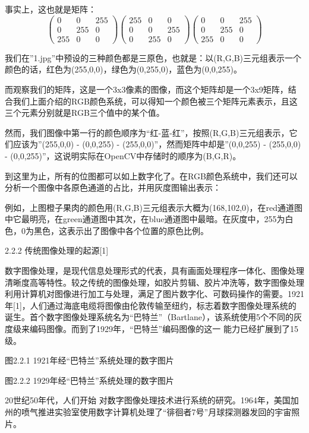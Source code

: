 	事实上，这也就是矩阵：
$$\begin{pmatrix}0&0&255\\0&255&0\\255&0&0\end{pmatrix}\begin{pmatrix}255&0&0\\0&0&255\\0&255&0\end{pmatrix}\begin{pmatrix}0&0&255\\0&255&0\\255&0&0\end{pmatrix}$$

	我们在”1.jpg”中预设的三种颜色都是三原色，也就是：以(R,G,B)三元组表示一个颜色的话，红色为(255,0,0)，绿色为(0,255,0)，蓝色为(0,0,255)。

	而观察我们的矩阵，这是一个3x3像素的图像，而这个矩阵却是一个3x9矩阵，结合我们上面介绍的RGB颜色系统，可以得知一个颜色被三个矩阵元素表示，且这三个元素分别就是RGB三个值中的某个值。

	然而，我们图像中第一行的颜色顺序为“红-蓝-红”，按照(R,G,B)三元组表示，它们应该为”(255,0,0) - (0,0,255) - (255,0,0)”，然而矩阵中却是”(0,0,255) - (255,0,0) - (0,0,255)”，这说明实际在OpenCV中存储时的顺序为(B,G,R)。

	到这里为止，所有的位图都可以如上数字化了。在RGB颜色系统中，我们还可以分析一个图像中各原色通道的占比，并用灰度图输出表示：

	例如，上图橙子果肉的颜色用(R,G,B)三元组表示大概为(168,102,0)，在red通道图中它最明亮，在green通道图中其次，在blue通道图中最暗。在灰度中，255为白色，0为黑色，这表示出了图像中各个位置的原色比例。

2.2.2 传统图像处理的起源[1]

	数字图像处理，是现代信息处理形式的代表，具有画面处理程序一体化、图像处理清晰度高等特性。较之传统的图像处理，如胶片剪辑、胶片冲洗等，数字图像处理利用计算机对图像进行加工与处理，满足了图片数字化、可数码操作的需要。1921年[1]，人们通过海底电缆将图像由伦敦传输至纽约，标志着数字图像处理系统的诞生。首个数字图像处理系统名为“巴特兰”（Bartlane），该系统使用5个不同的灰度级来编码图像。而到了1929年，“巴特兰”编码图像的这一 能力已经扩展到了15级。

图2.2.1 1921年经“巴特兰”系统处理的数字图片

图2.2.2 1929年经“巴特兰”系统处理的数字图片

20世纪50年代，人们开始 对数字图像处理技术进行系统的研究。1964年，美国加州的喷气推进实验室使用数字计算机处理了“徘徊者7号”月球探测器发回的宇宙照片。

